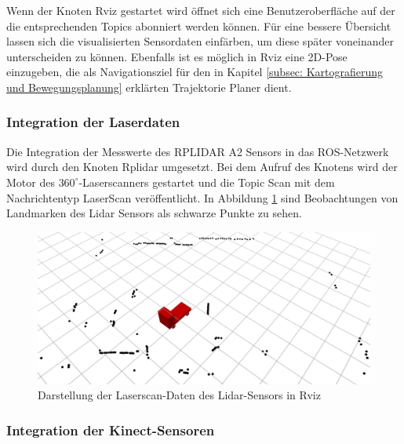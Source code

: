 			Wenn der Knoten Rviz gestartet wird öffnet sich eine Benutzeroberfläche auf der die entsprechenden Topics abonniert werden können. Für eine bessere Übersicht lassen sich die visualisierten Sensordaten einfärben, um diese später voneinander unterscheiden zu können. Ebenfalls ist es möglich in Rviz eine 2D-Pose einzugeben, die als Navigationsziel für den in Kapitel \ref{subsec: Kartografierung und Bewegungsplanung} erklärten Trajektorie Planer dient. \cite{rviz}  
		
		    \subsubsection{Integration der Laserdaten}
		    \label{subsubsec: Übersetzen der Laserdaten}
		    	
		    	Die Integration der Messwerte des RPLIDAR A2 Sensors in das ROS-Netzwerk wird durch den Knoten \glqq Rplidar\grqq{} umgesetzt. Bei dem Aufruf des Knotens wird der Motor des $360^\circ$-Laserscanners gestartet und die Topic \glqq Scan\grqq{} mit dem Nachrichtentyp \glqq LaserScan \grqq{} veröffentlicht. In Abbildung \ref{fig: Laserscan des RPLIDAR in Rviz} sind Beobachtungen von Landmarken des Lidar Sensors als schwarze Punkte zu sehen. \cite{rplidar}
		    	
		    	\begin{figure}[H]
		    		\centering
		    		\includegraphics[width=1.0\textwidth]{Bilder/laserscan.png}
		    		\caption{Darstellung der Laserscan-Daten des Lidar-Sensors in Rviz}
		    		\label{fig: Laserscan des RPLIDAR in Rviz}
		    	\end{figure}
		    
		    	
		    \subsubsection{Integration der Kinect-Sensoren}
		    \label{subsubsec: Kinect-Sensor}	    
		    

